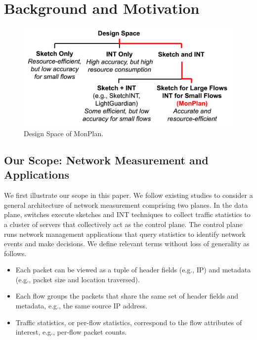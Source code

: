 \section{Background and Motivation}\label{background}

\begin{figure}
    \centering
    \includegraphics[width=\linewidth]{pics/DesignSpace.png}
    \caption{Design Space of MonPlan.}
    \label{DesignSpace}
\end{figure}

\subsection{Our Scope: Network Measurement and Applications}

We first illustrate our scope in this paper. We follow existing studies \cite{namkung2022sketchlib,anup2022hetero,liu2016one} to consider a general architecture of network measurement comprising two planes. In the data plane, switches execute sketches and INT techniques to collect traffic statistics to a cluster of servers that collectively act as the control plane. The control plane runs network management applications that query statistics to identify network events and make decisions. We define relevant terms without loss of generality as follows.

\begin{itemize}[leftmargin=*]
%
    \item Each packet can be viewed as a tuple of header fields (e.g., IP) and metadata (e.g., packet size and location traversed).
%
    \item Each flow groups the packets that share the same set of header fields and metadata, e.g., the same source IP address. 
%
    \item Traffic statistics, or per-flow statistics, correspond to the flow attributes of interest, e.g., per-flow packet counts. 
%
\end{itemize}

